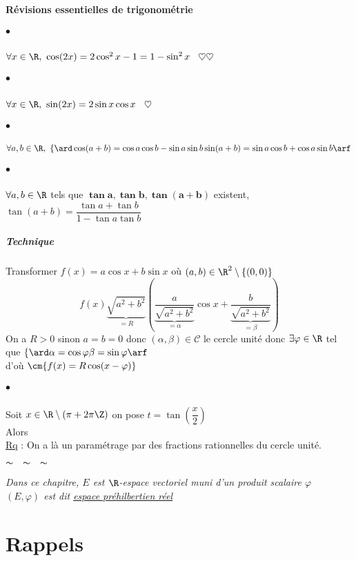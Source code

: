 

\minitoc
	\newpage
	\paragraph{Révisions essentielles de trigonométrie}
		\subparagraph{$\bullet$} $\forall x\in \R,~\cos (2x) = 2\cos^2 x-1 = 1 -\sin^2 x$ $~~\heartsuit\heartsuit$
		\subparagraph{$\bullet$} $\forall x\in \R ,~\sin (2x) = 2\sin x\cos x$ $~~\heartsuit$
		\subparagraph{$\bullet$} $\forall a,b \in \R ,~\left\{ \ard \cos (a+b) = \cos a\cos b - \sin a \sin b \\ \sin (a+b) = \sin a\cos b + \cos a\sin b \arf\right. $
		\subparagraph{$\bullet$} $\forall a,b \in \R$ tels que $\mathbf{\tan a ,\tan b , \tan (a+b)}$ existent, $\tan(a+b) = \dfrac{\tan a + \tan b}{1-\tan a\tan b}$
		\subparagraph{Technique}
			Transformer $f(x) = a\cos x + b\sin x$ où $(a,b)\in\R^2 \setminus\{(0,0)\}$\\
			\[ f(x) \underbrace{\sqrt{a^2 +b^2}}_{=R} ( \underbrace{\frac{a}{\sqrt{a^2 +b^2}}}_{=\alpha}\cos x + \underbrace{\frac{b}{\sqrt{a^2+b^2}}}_{=\beta} ) \]
			On a $R>0$ sinon $a=b=0$ donc $(\alpha,\beta) \in  \mathcal{C}$ le cercle unité donc $\exists \varphi \in \R $ tel que $\left\{ \ard \alpha = \cos \varphi \\ \beta = \sin \varphi \arf \right.$\\
			d'où $\cm{ f(x) = R\cos (x-\varphi) }$
		\subparagraph{$\bullet$} Soit $x\in \R \setminus (\pi +2\pi \Z)$ on pose $t=\tan (\dfrac{x}{2})$ \\
		\hspace*{2.5cm} Alors \\
		\uline{Rq} : On a là un paramétrage par des fractions rationnelles du cercle unité. \vspace*{0.5cm} \\
		\begin{center}
			{\Huge $\thicksim ~~~ \thicksim ~~~ \thicksim $}
		\end{center}
		${}$ \\
		\textit{Dans ce chapitre, $E$ est $\R$-espace vectoriel muni d'un produit scalaire $\varphi$\\
		$(E,\varphi)$ est dit \uline{espace préhilbertien réel}}
	\section{Rappels}

